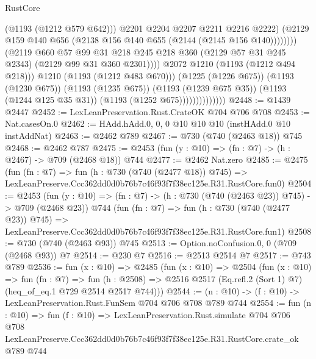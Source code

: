 \begin{lexlean}{RustCore}
\begin{coremodule}
                                                (@1193 (@1212 @579 @642)))
                                              @2201
                                              @2204
                                              @2207
                                              @2211
                                              @2216
                                              @2222)
                                            (@2129
                                              @159
                                              @140
                                              @656
                                              (@2138 @156 @140 @655 (@2144 (@2145 @156 @140))))))))
                                    (@2119
                                      @660
                                      @57
                                      @99
                                      @31
                                      @218
                                      @245
                                      @218
                                      @360
                                      (@2129 @57 @31 @245 @2343)
                                      (@2129 @99 @31 @360 @2301))))
                                @2072
                                @1210
                                (@1193 (@1212 @494 @218)))
                              @1210
                              (@1193 (@1212 @483 @670)))
                            (@1225 (@1226 @675))
                            (@1193 (@1230 @675))
                            (@1193 (@1235 @675))
                            (@1193 (@1239 @675 @35))
                            (@1193 (@1244 @125 @35 @31))
                            (@1193 (@1252 @675))))))))))))))
@2448 := @1439 @2447
@2452 := LexLeanPreservation.Rust.CrateOK @704 @706 @708
@2453 := Nat.casesOn.{0}
@2462 := HAdd.hAdd.{0, 0, 0} @10 @10 @10 (instHAdd.{0} @10 instAddNat)
@2463 := @2462 @789
@2467 := @730 (@740 (@2463 @18)) @745
@2468 := @2462 @787
@2475 := @2453 (fun (y : @10) => (fn : @7) -> (h : @2467) -> @709 (@2468 @18)) @744
@2477 := @2462 Nat.zero
@2485 := @2475
    (fun (fn : @7) =>
    fun (h : @730 (@740 (@2477 @18)) @745) =>
    LexLeanPreserve.Ccc362dd0d0b76b7c46f93f7f38ec125e.R31.RustCore.fun0)
@2504 := @2453
    (fun (y : @10) => (fn : @7) -> (h : @730 (@740 (@2463 @23)) @745) -> @709 (@2468 @23))
    @744
    (fun (fn : @7) =>
    fun (h : @730 (@740 (@2477 @23)) @745) =>
    LexLeanPreserve.Ccc362dd0d0b76b7c46f93f7f38ec125e.R31.RustCore.fun1)
@2508 := @730 (@740 (@2463 @93)) @745
@2513 := Option.noConfusion.{0, 0} (@709 (@2468 @93)) @7
@2514 := @230 @7
@2516 := @2513 @2514 @7
@2517 := @743 @789
@2536 := fun (x : @10) =>
  @2485
    (fun (x : @10) =>
    @2504
      (fun (x : @10) =>
      fun (fn : @7) =>
      fun (h : @2508) =>
      @2516 @2517 (Eq.refl.{2} (Sort 1) @7) (heq_of_eq.{1} @729 @2514 @2517 @744)))
@2544 := (n : @10) -> (f : @10) -> LexLeanPreservation.Rust.FunSem @704 @706 @708 @789 @744
@2554 := fun (n : @10) =>
  fun (f : @10) =>
  LexLeanPreservation.Rust.simulate
    @704
    @706
    @708
    LexLeanPreserve.Ccc362dd0d0b76b7c46f93f7f38ec125e.R31.RustCore.crate_ok
    @789
    @744
\end{coremodule}
\end{lexlean}
